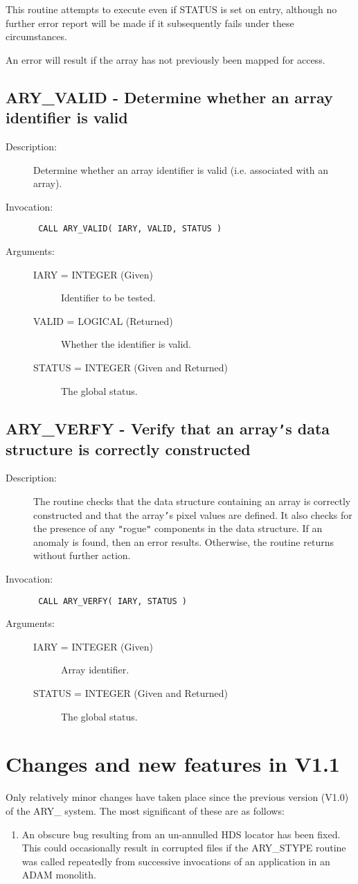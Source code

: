 \documentclass[twoside,11pt]{article}
\newcommand{\xlabel}[1]{}
\newlength{\sstbannerlength}
\newlength{\sstcaptionlength}
\newlength{\sstexampleslength}
\newlength{\sstexampleswidth}
\newcommand{\sstroutine}[3]{
   \goodbreak
   \rule{\textwidth}{0.5mm}
   \vspace{-7ex}
   \newline
   \settowidth{\sstbannerlength}{{\Large {\bf #1}}}
   \setlength{\sstcaptionlength}{\textwidth}
   \setlength{\sstexampleslength}{\textwidth}
   \addtolength{\sstbannerlength}{0.5em}
   \addtolength{\sstcaptionlength}{-2.0\sstbannerlength}
   \addtolength{\sstcaptionlength}{-5.0pt}
   \settowidth{\sstexampleswidth}{{\bf Examples:}}
   \addtolength{\sstexampleslength}{-\sstexampleswidth}
   \parbox[t]{\sstbannerlength}{\flushleft{\Large {\bf #1}}}
   \parbox[t]{\sstcaptionlength}{\center{\Large #2}}
   \parbox[t]{\sstbannerlength}{\flushright{\Large {\bf #1}}}
   \begin{description}
      #3
   \end{description}
}
\newcommand{\sstdescription}[1]{\item[Description:] #1}
\newcommand{\sstinvocation}[1]{\item[Invocation:]\hspace{0.4em}{\tt #1}}
\newcommand{\sstarguments}[1]{
   \item[Arguments:] \mbox{} \\
   \vspace{-3.5ex}
   \begin{description}
      #1
   \end{description}
}
\newcommand{\sstsubsection}[1]{ \item[{#1}] \mbox{} \\}
\newcommand{\sstitem}{\item}
\newcommand{\ssttt}{\tt}
\renewcommand{\sstroutine}[3]{
      \subsection{#1\xlabel{#1}-\label{#1}#2}
      \begin{description}
         #3
      \end{description}
   }
\renewcommand{\sstdescription}[1]{\item[Description:]
      \begin{description}
         #1
      \end{description}
   }
\renewcommand{\sstinvocation}[1]{\item[Invocation:]
      \begin{description}
         {\ssttt #1}
      \end{description}
   }
\renewcommand{\sstarguments}[1]{
      \item[Arguments:]
      \begin{description}
         #1
      \end{description}
   }
\renewcommand{\sstsubsection}[1]{\item[{#1}]}
\begin{document}
\begin{eqn*}
{{{         \sstitem
         This routine attempts to execute even if STATUS is set on
         entry, although no further error report will be made if it
         subsequently fails under these circumstances.

         \sstitem
         An error will result if the array has not previously been
         mapped for access.
      }
   }
}
\sstroutine{
   ARY\_VALID
}{
   Determine whether an array identifier is valid
}{
   \sstdescription{
      Determine whether an array identifier is valid (i.e. associated
      with an array).
   }
   \sstinvocation{
      CALL ARY\_VALID( IARY, VALID, STATUS )
   }
   \sstarguments{
      \sstsubsection{
         IARY = INTEGER (Given)
      }{
         Identifier to be tested.
      }
      \sstsubsection{
         VALID = LOGICAL (Returned)
      }{
         Whether the identifier is valid.
      }
      \sstsubsection{
         STATUS = INTEGER (Given and Returned)
      }{
         The global status.
      }
   }
}
\sstroutine{
   ARY\_VERFY
}{
   Verify that an array{\tt '}s data structure is correctly constructed
}{
   \sstdescription{
      The routine checks that the data structure containing an array is
      correctly constructed and that the array{\tt '}s pixel values are
      defined. It also checks for the presence of any {\tt "}rogue{\tt "}
      components in the data structure. If an anomaly is found, then an
      error results. Otherwise, the routine returns without further
      action.
   }
   \sstinvocation{
      CALL ARY\_VERFY( IARY, STATUS )
   }
   \sstarguments{
      \sstsubsection{
         IARY = INTEGER (Given)
      }{
         Array identifier.
      }
      \sstsubsection{
         STATUS = INTEGER (Given and Returned)
      }{
         The global status.
      }
   }
}


\newpage
\section{\xlabel{changes_and_new_features_in_v11}%
Changes and new features in V1.1}
\label{changes_and_new_features_in_v11}

Only relatively minor changes have taken place since the previous
version (V1.0) of the ARY\_ system.  The most significant of these are
as follows:

\begin{enumerate}

\item An obscure bug resulting from an un-annulled HDS locator has been
fixed.  This could occasionally result in corrupted files if the
ARY\_STYPE routine was called repeatedly from successive invocations of
an application in an ADAM monolith.


\end{enumerate}
\end{eqn*}
\end{document}
